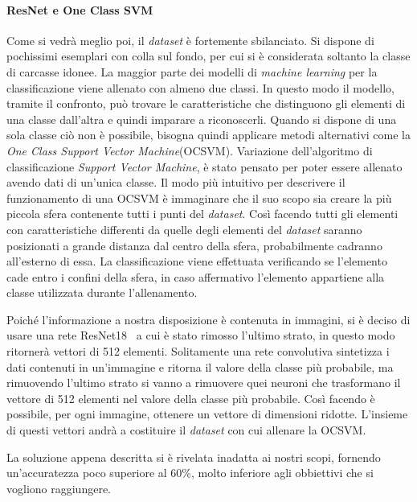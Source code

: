 \paragraph{ResNet e One Class SVM} %
Come si vedrà meglio poi, il \textit{dataset} è fortemente sbilanciato.
Si dispone di pochissimi esemplari con colla sul fondo, per cui si è considerata soltanto la classe di carcasse idonee.
La maggior parte dei modelli di \textit{machine learning} per la classificazione viene allenato con almeno due classi.
In questo modo il modello, tramite il confronto, può trovare le caratteristiche che distinguono gli elementi di una classe dall'altra e quindi imparare a riconoscerli.
Quando si dispone di una sola classe ciò non è possibile, bisogna quindi applicare metodi alternativi come la \textit{One Class Support Vector Machine}(OCSVM).
Variazione dell'algoritmo di classificazione \textit{Support Vector Machine}, è stato pensato per poter essere allenato avendo dati di un'unica classe.
Il modo più intuitivo per descrivere il funzionamento di una OCSVM è immaginare che il suo scopo sia creare la più piccola sfera contenente tutti i punti del \textit{dataset}.
Così facendo tutti gli elementi con caratteristiche differenti da quelle degli elementi del \textit{dataset} saranno posizionati a grande distanza dal centro della sfera, probabilmente cadranno all'esterno di essa.
La classificazione viene effettuata verificando se l'elemento cade entro i confini della sfera, in caso affermativo l'elemento appartiene alla classe utilizzata durante l'allenamento.

Poiché l'informazione a nostra disposizione è contenuta in immagini, si è deciso di usare una rete ResNet18~\cite{resnet} a cui è stato rimosso l'ultimo strato, in questo modo ritornerà vettori di 512 elementi.
Solitamente una rete convolutiva sintetizza i dati contenuti in un'immagine e ritorna il valore della classe più probabile, ma rimuovendo l'ultimo strato si vanno a rimuovere quei neuroni che trasformano il vettore di 512 elementi nel valore della classe più probabile. %
Così facendo è possibile, per ogni immagine, ottenere un vettore di dimensioni ridotte.
L'insieme di questi vettori andrà a costituire il \textit{dataset} con cui allenare la OCSVM.

La soluzione appena descritta si è rivelata inadatta ai nostri scopi, fornendo un'accuratezza poco superiore al 60\%, molto inferiore agli obbiettivi che si vogliono raggiungere.

